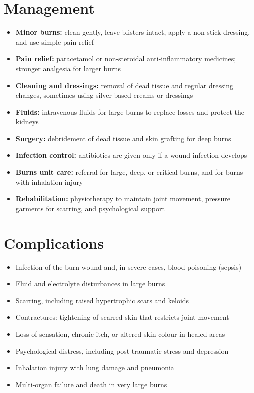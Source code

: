 \section*{Management}
\begin{itemize}
    \item \textbf{Minor burns:} clean gently, leave blisters intact, apply a non-stick dressing, and use simple pain relief
    \item \textbf{Pain relief:} paracetamol or non-steroidal anti-inflammatory medicines; stronger analgesia for larger burns
    \item \textbf{Cleaning and dressings:} removal of dead tissue and regular dressing changes, sometimes using silver-based creams or dressings
    \item \textbf{Fluids:} intravenous fluids for large burns to replace losses and protect the kidneys
    \item \textbf{Surgery:} debridement of dead tissue and skin grafting for deep burns
    \item \textbf{Infection control:} antibiotics are given only if a wound infection develops
    \item \textbf{Burns unit care:} referral for large, deep, or critical burns, and for burns with inhalation injury
    \item \textbf{Rehabilitation:} physiotherapy to maintain joint movement, pressure garments for scarring, and psychological support
\end{itemize}

\section*{Complications}
\begin{itemize}
    \item Infection of the burn wound and, in severe cases, blood poisoning (sepsis)
    \item Fluid and electrolyte disturbances in large burns
    \item Scarring, including raised hypertrophic scars and keloids
    \item Contractures: tightening of scarred skin that restricts joint movement
    \item Loss of sensation, chronic itch, or altered skin colour in healed areas
    \item Psychological distress, including post-traumatic stress and depression
    \item Inhalation injury with lung damage and pneumonia
    \item Multi-organ failure and death in very large burns
\end{itemize}

